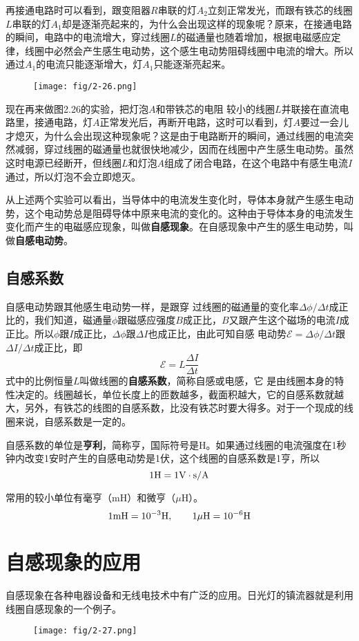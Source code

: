 再接通电路时可以看到，跟变阻器$R$串联的灯$A_2$立刻正常发光，而跟有铁芯的线圈$L$串联的灯$A_1$却是逐渐亮起来的，为什么会出现这样的现象呢？原来，在接通电路的瞬间，电路中的电流增大，穿过线圈$L$的磁通量也随着增加，根据电磁感应定律，线圈中必然会产生感生电动势，这个感生电动势阻碍线圈中电流的增大。所以通过$A_1$的电流只能逐渐增大，灯$A_1$只能逐渐亮起来。
\begin{figure}[htp]\centering
\texttt{[image: fig/2-26.png]}
\caption{}
\end{figure}

现在再来做图2.26的实验，把灯泡$A$和带铁芯的电阻
较小的线圈$L$并联接在直流电路里，接通电路，灯$A$正常发光后，再断开电路，这时可以看到，灯$A$要过一会儿才熄灭，为什么会出现这种现象呢？这是由于电路断开的瞬间，通过线圈的电流突然减弱，穿过线圈的磁通量也就很快地减少，因而在线圈中产生感生电动势。虽然这时电源已经断开，但线圈$L$和灯泡$A$组成了闭合电路，在这个电路中有感生电流$I$通过，所以灯泡不会立即熄灭。

从上述两个实验可以看出，当导体中的电流发生变化时，导体本身就产生感生电动势，这个电动势总是阻碍导体中原来电流的变化的。这种由于导体本身的电流发生变化而产生的电磁感应现象，叫做\textbf{自感现象}。在自感现象中产生的感生电动势，叫做\textbf{自感电动势}。

\subsection{自感系数}
自感电动势跟其他感生电动势一样，是跟穿
过线圈的磁通量的变化率$\Delta\phi/\Delta t$成正比的，我们知道，磁通量$\phi$跟磁感应强度$B$成正比，$B$又跟产生这个磁场的电流$I$成正比。所以$\phi$跟$I$成正比，$\Delta \phi$跟$\Delta I$也成正比，由此可知自感
电动势$\mathcal{E}=\Delta\phi/\Delta t$跟$\Delta I/\Delta t$成正比，即
\[\mathcal{E}=L\frac{\Delta I}{\Delta t}\]
式中的比例恒量$L$叫做线圈的\textbf{自感系数}，简称自感或电感，它
是由线圈本身的特性决定的。线圈越长，单位长度上的匝数越多，截面积越大，它的自感系数就越大，另外，有铁芯的线图的自感系数，比没有铁芯时要大得多。对于一个现成的线圈来说，自感系数是一定的。

自感系数的单位是\textbf{亨利}，简称亨，国际符号是H。如果通过线圈的电流强度在1秒钟内改变1安时产生的自感电动势是1伏，这个线圈的自感系数是1亨，所以
\[1{\rm H}=1{\rm V}\cdot {\rm s}/{\rm A}\]

常用的较小单位有毫亨（mH）和微亨（$\mu$H）。
\[1{\rm mH}=10^{-3}{\rm H},\qquad 1\mu{\rm H}=10^{-6}{\rm H}  \]

\section{自感现象的应用}
自感现象在各种电器设备和无线电技术中有广泛的应用。日光灯的镇流器就是利用线圈自感现象的一个例子。
\begin{figure}[htp]\centering
\texttt{[image: fig/2-27.png]}
\caption{}
\end{figure}


